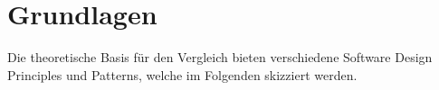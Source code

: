 \pagebreak

\section{Grundlagen}
Die theoretische Basis für den Vergleich bieten verschiedene Software Design Principles und Patterns, welche
im Folgenden skizziert werden.



